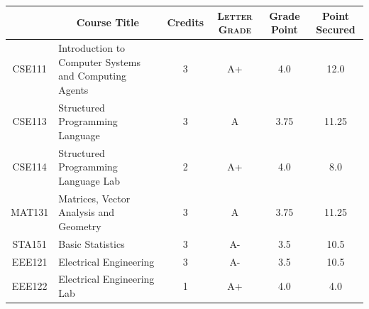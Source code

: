 \documentclass[11pt]{article}
\newcommand*{\numtwo}[1]{\pgfmathprintnumber[
                    fixed, precision=2, fixed zerofill=true]{#1}}
\begin{document}
                \begin{center}
                    \renewcommand{\arraystretch}{1.08}
                    
                \begin{tabular}{|c|l|c|>{\scshape}c|c|c|}
                \hline  \rule[-1ex]{0pt}{3.5ex} {\centering{\bf Course Code}} &  \multicolumn{1}{c|}{\textbf{Course Title}}  & {\bf Credits} & {\bf Letter Grade} & {\bf Grade Point} & {\bf Point Secured}  \\ 
                \hline   CSE111 &  Introduction to Computer Systems and Computing Agents		 & 3 & A+ & 4.0 & 12.0 \\ %
                \hline   CSE113 &  Structured Programming Language		 & 3 & A & 3.75 & 11.25 \\ %
                \hline   CSE114 &  Structured Programming Language Lab		 & 2 & A+ & 4.0 & 8.0 \\ %
                \hline   MAT131 &  Matrices, Vector Analysis and Geometry		 & 3 & A & 3.75 & 11.25 \\ %
                \hline   STA151 &  Basic Statistics		 & 3 & A- & 3.5 & 10.5 \\ %
                \hline   EEE121 &  Electrical Engineering		 & 3 & A- & 3.5 & 10.5 \\ %
                \hline   EEE122 &  Electrical Engineering Lab		 & 1 & A+ & 4.0 & 4.0 \\ %

\hline                %
                \end{tabular}
                \end{center}
                \renewcommand{\arraystretch}{1.03}
\end{document}
